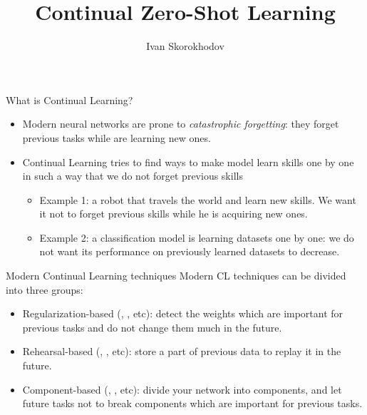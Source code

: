 \documentclass[handout, 10pt]{beamer}
\title{Continual Zero-Shot Learning}
\author{Ivan Skorokhodov}
\begin{document}
\begin{frame}
    \titlepage
\end{frame}

\begin{frame}{What is Continual Learning?}
    \begin{itemize}
        \item\pause Modern neural networks are prone to \textit{catastrophic forgetting}: they forget previous tasks while are learning new ones.
        \item\pause Continual Learning tries to find ways to make model learn skills one by one in such a way that we do not forget previous skills
        \begin{itemize}
            \item\pause Example 1: a robot that travels the world and learn new skills. We want it not to forget previous skills while he is acquiring new ones.
            \item\pause Example 2: a classification model is learning datasets one by one: we do not want its performance on previously learned datasets to decrease.
        \end{itemize}
    \end{itemize}
%    
    \begin{figure}
        
    \end{figure}
\end{frame}

\begin{frame}{Modern Continual Learning techniques}
    \pause Modern CL techniques can be divided into three groups:
    \begin{itemize}
        \item\pause Regularization-based (\cite{EWC}, \cite{MAS}, etc): detect the weights which are important for previous tasks and do not change them much in the future.
        \item\pause Rehearsal-based (\cite{A-GEM}, \cite{MeRGAN}, etc): store a part of previous data to replay it in the future. 
        \item\pause Component-based (\cite{HAT}, \cite{PathNet}, etc): divide your network into components, and let future tasks not to break components which are important for previous tasks.
    \end{itemize}
\end{frame}
\end{document}
